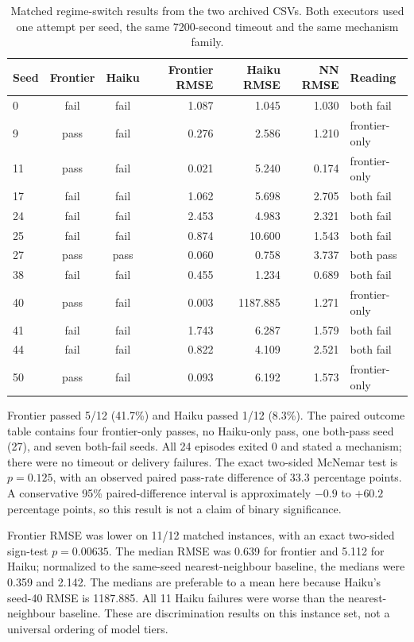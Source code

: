 \documentclass[11pt]{article}
\theoremstyle{definition}
\begin{document}
\begin{table}[h]
\centering\scriptsize
\begin{tabularx}{\textwidth}{@{}lccrrrY@{}}
\toprule
Seed & Frontier & Haiku & Frontier RMSE & Haiku RMSE & NN RMSE & Reading \\
  & fail & fail & 1.087 & 1.045 & 1.030 & both fail \\
9  & pass & fail & 0.276 & 2.586 & 1.210 & frontier-only \\
11 & pass & fail & 0.021 & 5.240 & 0.174 & frontier-only \\
17 & fail & fail & 1.062 & 5.698 & 2.705 & both fail \\
24 & fail & fail & 2.453 & 4.983 & 2.321 & both fail \\
25 & fail & fail & 0.874 & 10.600 & 1.543 & both fail \\
27 & pass & pass & 0.060 & 0.758 & 3.737 & both pass \\
38 & fail & fail & 0.455 & 1.234 & 0.689 & both fail \\
40 & pass & fail & 0.003 & 1187.885 & 1.271 & frontier-only \\
41 & fail & fail & 1.743 & 6.287 & 1.579 & both fail \\
44 & fail & fail & 0.822 & 4.109 & 2.521 & both fail \\
50 & pass & fail & 0.093 & 6.192 & 1.573 & frontier-only \\
\bottomrule
\end{tabularx}
\caption{Matched regime-switch results from the two archived CSVs. Both executors used one attempt per seed, the same 7200-second timeout and the same mechanism family.}
\end{table}

Frontier passed 5/12 (41.7\%) and Haiku passed 1/12 (8.3\%). The paired outcome table
contains four frontier-only passes, no Haiku-only pass, one both-pass seed (27), and
seven both-fail seeds. All 24 episodes exited 0 and stated a mechanism; there were no
timeout or delivery failures. The exact two-sided McNemar test is $p=0.125$, with an
observed paired pass-rate difference of 33.3 percentage points. A conservative 95\%
paired-difference interval is approximately $-0.9$ to $+60.2$ percentage points, so
this result is not a claim of binary significance.

Frontier RMSE was lower on 11/12 matched instances, with an exact two-sided sign-test
$p=0.00635$. The median RMSE was 0.639 for frontier and 5.112 for Haiku; normalized
to the same-seed nearest-neighbour baseline, the medians were 0.359 and 2.142.
The medians are preferable to a mean here because Haiku's seed-40 RMSE is 1187.885.
All 11 Haiku failures were worse than the nearest-neighbour baseline. These are
discrimination results on this instance set, not a universal ordering of model tiers.
\end{document}

